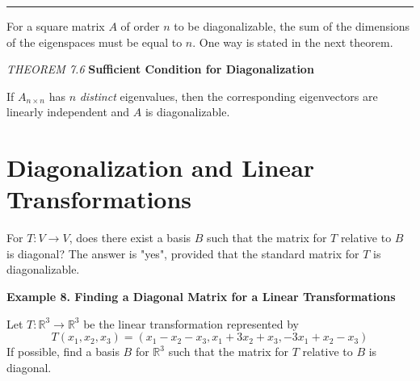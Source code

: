 \documentclass{article}
\newcommand\R{\mathbb{R}}
\begin{document}
    {\color{blue9} \rule{10cm}{0.3mm}}

    For a square matrix $A$ of order $n$ to be diagonalizable, the sum of the dimensions of the eigenspaces must be equal to $n$.
    One way is stated in the next theorem.
    \begin{tcolorbox}[colback = {blue9}]
        \textit{THEOREM 7.6} \textbf{Sufficient Condition for Diagonalization}

        If $A_{n \times n}$ has $n$ \textit{distinct} eigenvalues, then the corresponding eigenvectors are linearly independent and
        $A$ is diagonalizable.
    \end{tcolorbox}

    \section{Diagonalization and Linear Transformations}
    For $T: V \to  V$, does there exist a basis $B$ such that the matrix for $T$ relative to $B$ is diagonal? The answer is "yes",
    provided that the standard matrix for $T$ is diagonalizable.

    \textbf{Example 8. \textcolor{blue5}{Finding a Diagonal Matrix for a Linear Transformations}}

    Let $T: \R^3  \to  \R^3 $ be the linear transformation represented  by
    \[T(x_1, x_2, x_3) = (x_1 - x_2 -x_3, x_1 + 3x_2 + x_3, -3x_1 + x_2 - x_3) \]
    If possible, find a basis $B$ for $ \R^3 $ such that the matrix for $T$ relative to $B$ is diagonal.
\end{document}

